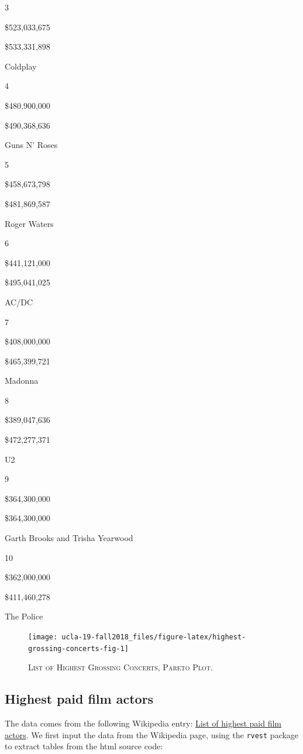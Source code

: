 \documentclass[]{book}
\theoremstyle{definition}
\theoremstyle{definition}
\theoremstyle{definition}
\theoremstyle{remark}
\begin{document}
3

\$523,033,675

\$533,331,898

Coldplay

4

\$480,900,000

\$490,368,636

Guns N' Roses

5

\$458,673,798

\$481,869,587

Roger Waters

6

\$441,121,000

\$495,041,025

AC/DC

7

\$408,000,000

\$465,399,721

Madonna

8

\$389,047,636

\$472,277,371

U2

9

\$364,300,000

\$364,300,000

Garth Brooks and Trisha Yearwood

10

\$362,000,000

\$411,460,278

The Police




\begin{figure}

{\centering \texttt{[image: ucla-19-fall2018\_files/figure-latex/highest-grossing-concerts-fig-1]} 

}

\caption{\textsc{List of Highest Grossing
Concerts, Pareto Plot.}}\label{fig:highest-grossing-concerts-fig}
\end{figure}

\subsection{Highest paid film actors}\label{highest-paid-film-actors}

The data comes from the following Wikipedia entry:
\href{https://en.wikipedia.org/wiki/List_of_highest_paid_film_actors}{List
of highest paid film actors}. We first input the data from the Wikipedia
page, using the \texttt{rvest} package to extract tables from the html
source code:
\end{document}
